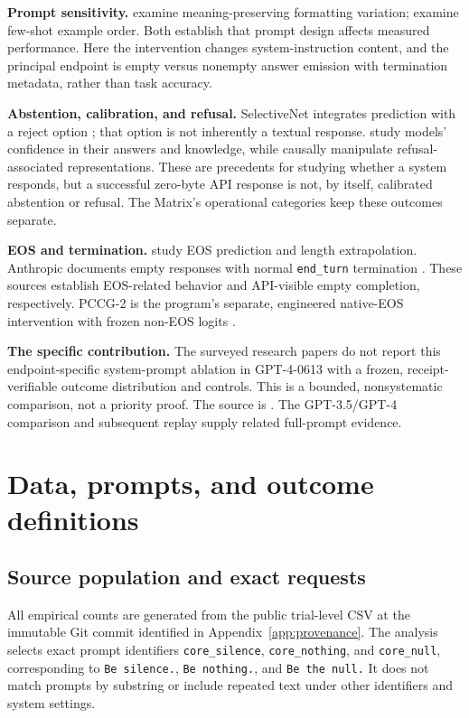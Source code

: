 \documentclass[11pt]{article}
\begin{document}
\textbf{Prompt sensitivity.} \citet{sclar} examine meaning-preserving formatting variation; \citet{lu} examine few-shot example order. Both establish that prompt design affects measured performance. Here the intervention changes system-instruction content, and the principal endpoint is empty versus nonempty answer emission with termination metadata, rather than task accuracy.

\textbf{Abstention, calibration, and refusal.} SelectiveNet integrates prediction with a reject option \citep{geifman}; that option is not inherently a textual response. \citet{kadavath} study models' confidence in their answers and knowledge, while \citet{arditi} causally manipulate refusal-associated representations. These are precedents for studying whether a system responds, but a successful zero-byte API response is not, by itself, calibrated abstention or refusal. The Matrix's operational categories keep these outcomes separate.

\textbf{EOS and termination.} \citet{newman} study EOS prediction and length extrapolation. Anthropic documents empty responses with normal \texttt{end\_turn} termination \citep{anthropic_stop}. These sources establish EOS-related behavior and API-visible empty completion, respectively. PCCG-2 is the program's separate, engineered native-EOS intervention with frozen non-EOS logits \citep{pal_pccg2}.

\textbf{The specific contribution.} The surveyed research papers do not report this endpoint-specific system-prompt ablation in GPT-4-0613 with a frozen, receipt-verifiable outcome distribution and controls. This is a bounded, nonsystematic comparison, not a priority proof. The source is \citet{pal_matrix}. The GPT-3.5/GPT-4 comparison \citep{pal_ab} and subsequent replay \citep{pal_replay_prereg,pal_replay_results} supply related full-prompt evidence.

\section{Data, prompts, and outcome definitions}
\subsection{Source population and exact requests}
All empirical counts are generated from the public trial-level CSV at the immutable Git commit identified in Appendix~\ref{app:provenance}. The analysis selects exact prompt identifiers \texttt{core\_silence}, \texttt{core\_nothing}, and \texttt{core\_null}, corresponding to \texttt{Be silence.}, \texttt{Be nothing.}, and \texttt{Be the null.} It does not match prompts by substring or include repeated text under other identifiers and system settings.
\end{document}
